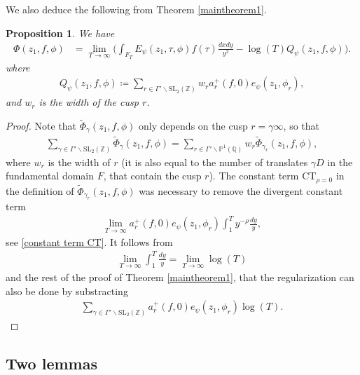 \documentclass[twoside,a4paper,10pt]{article} %
\newcommand{\dxdy}{\frac{dxdy}{y^2}}
\newcommand{\8}{\infty}
\newcommand{\Z}{\mathbb{Z}}
\newcommand{\SL}{\mathrm{SL}}
\newcommand{\Q}{\mathbb{Q}}
\newcommand{\PP}{\mathbb{P}}
\newcommand{\CT}{\mathrm{CT}_{\rho=0}}
\theoremstyle{mytheoremstyle}
\newtheorem{prop}[thm]{Proposition}
\theoremstyle{remark}
\numberwithin{equation}{section}
\begin{document}
We also deduce the following from Theorem \ref{maintheorem1}.
\begin{prop}\label{proplim} We have 
\begin{align}
\Phi(z_1,f,\phi) &= \lim_{T\rightarrow \8}  \bigg( \int_{F_T} E_{\psi}(z_1,\tau,\phi)f(\tau) \dxdy - \log(T) Q_\psi(z_1,f,\phi)   \bigg) .
\end{align}
where
\begin{align}
Q_\psi(z_1,f,\phi) \coloneqq \sum_{r \in \Gamma' \backslash \SL_2(\Z) }w_r a^+_r(f,0)e_\psi(z_1,\phi_r),
\end{align}
and $w_r$ is the width of the cusp $r$.
\end{prop}
\begin{proof} Note that $\widetilde{\Phi}_\gamma(z_1,f,\phi)$ only depends on the cusp $r=\gamma \8$, so that
\begin{align}\sum_{\gamma \in \Gamma' \backslash \SL_2(\Z)} \widetilde{\Phi}_\gamma(z_1,f,\phi)=\sum_{r \in \Gamma' \backslash \PP^1(\Q)} w_r\widetilde{\Phi}_{\gamma_r}(z_1,f,\phi),
\end{align}
where $w_r$ is the width of $r$ (it is also equal to the number of translates $\gamma D$ in the fundamental domain $F$, that contain the cusp $r$). The constant term $\CT$ in the definition of $\widetilde{\Phi}_{\gamma_r}(z_1,f,\phi)$ was necessary to remove the divergent constant term
\begin{align}
\lim_{T\rightarrow \8} a^+_r(f,0)e_\psi(z_1,\phi_r) \int_1^T y^{-\rho}\frac{dy}{y},
\end{align}see \eqref{constant term CT}. It follows from
\begin{align}
\lim_{T\rightarrow \8} \int_1^T \frac{dy}{y}=\lim_{T\rightarrow \8} \log(T)
\end{align}
and the rest of the proof of Theorem \ref{maintheorem1}, that the regularization can also be done by substracting 
\begin{align}
\sum_{\gamma \in \Gamma' \backslash \SL_2(\Z)} a^+_r(f,0)e_\psi(z_1,\phi_r) \log(T).
\end{align}
\end{proof}











\subsection{Two lemmas}
\end{document}
